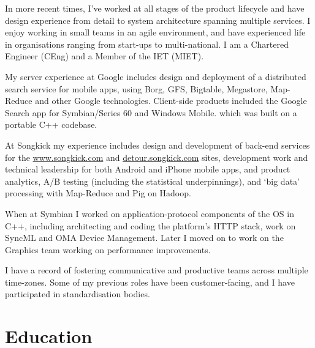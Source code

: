 \documentclass[margin = 0cm,line]{resume}
\begin{document}
\begin{resume}
    In more recent times, I've worked at all stages of the product lifecycle and have design experience from detail to
    system architecture spanning multiple services. I enjoy working in small teams in an agile environment, and have
    experienced life in organisations ranging from start-ups to multi-national.  I am a Chartered Engineer (CEng) and a
    Member of the IET (MIET).

    My server experience at Google includes design and deployment of a distributed search service for mobile apps,
    using Borg, GFS, Bigtable, Megastore, Map-Reduce and other Google technologies.  Client-side products included
    the Google Search app for Symbian/Series 60 and Windows Mobile. which was built on a portable C++ codebase.

    At Songkick my experience includes design and development of back-end services for the \url{www.songkick.com} and
    \url{detour.songkick.com} sites, development work and technical leadership for both Android and iPhone mobile apps,
    and product analytics, A/B testing (including the statistical underpinnings), and `big data' processing with
    Map-Reduce and Pig on Hadoop.

    When at Symbian I worked on application-protocol components of the OS in C++, including architecting and coding
    the platform's HTTP stack, work on SyncML and OMA Device Management.  Later I moved on to work on the Graphics team
    working on performance improvements.

    I have a record of fostering communicative and productive teams across multiple time-zones.  Some of my previous
    roles have been customer-facing, and I have participated in standardisation bodies.

    \section{\mysidestyle Education}


\end{resume}
\end{document}
